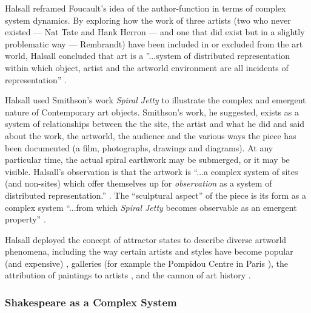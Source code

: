                 Halsall reframed Foucault's idea of the author-function in terms of complex system dynamics. By exploring how the work of three artists (two who never existed — Nat Tate and Hank Herron — and one that did exist but in a slightly problematic way — Rembrandt) have been included in or excluded from the art world, Halsall concluded that art is a ”...system of distributed representation within which object, artist and the artworld environment are all incidents of representation” \citep[p.195]{HalsallSystmsOfArt2008}.

                Halsall used Smithson's work \emph{Spiral Jetty} to illustrate the complex and emergent nature of Contemporary art objects. Smithson's work, he suggested, exists as a system of relationships between the the site, the artist and what he did and said about the work, the artworld, the audience and the various ways the piece has been documented (a film, photographs, drawings and diagrams). At any particular time, the actual spiral earthwork may be submerged, or it may be visible. Halsall's observation is that the artwork is “...a complex system of sites (and non-sites) which offer themselves up for \emph{observation} as a system of distributed representation.” \citep[p.149]{HalsallSystmsOfArt2008}. The “sculptural aspect” of the piece is its form as a complex system “...from which \emph{Spiral Jetty} becomes observable as an emergent property” \citep[p.151]{HalsallSystmsOfArt2008}.

                Halsall deployed the concept of attractor states to describe diverse artworld phenomena, including the way certain artists and styles have become popular (and expensive) \citep[pp.165-170]{HalsallSystmsOfArt2008}, galleries (for example the Pompidou Centre in Paris \citep[pp.179-182]{HalsallSystmsOfArt2008}), the attribution of paintings to artists \citep[p.197]{HalsallSystmsOfArt2008} \citep[p.215]{HalsallSystmsOfArt2008}, and the cannon of art history \citep[p.219]{HalsallSystmsOfArt2008}.
            
            \subsubsection{Shakespeare as a Complex System}\label{sec:ShakespeareAsAComplexSystem}

